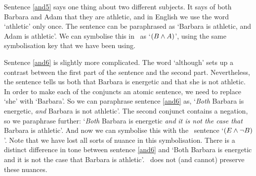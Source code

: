 Sentence \ref{and5} says one thing about two different subjects. It says of both Barbara and Adam that they are athletic, and in English we use the word `athletic' only once. The sentence can be paraphrased as `Barbara is athletic, and Adam is athletic'. We can symbolise this in \TFL\ as `$(B\wedge A)$', using the same symbolisation key that we have been using.

Sentence \ref{and6} is slightly more complicated. The word `although' sets up a contrast between the first part of the sentence and the second part. Nevertheless, the sentence tells us both that Barbara is energetic and that she is not athletic. In order to make each of the conjuncts an atomic sentence, we need to replace `she' with `Barbara'. So we can paraphrase sentence \ref{and6} as, `\emph{Both} Barbara is energetic, \emph{and} Barbara is not athletic'. The second conjunct contains a negation, so we paraphrase further: `\emph{Both} Barbara is energetic \emph{and} \emph{it is not the case that} Barbara is athletic'. And now we can symbolise this with the \TFL\ sentence `$(E\wedge\neg B)$'. Note that we have lost all sorts of nuance in this symbolisation. There is a distinct difference in tone between sentence \ref{and6} and `Both Barbara is energetic and it is not the case that Barbara is athletic'. \TFL\ does not (and cannot) preserve these nuances.

